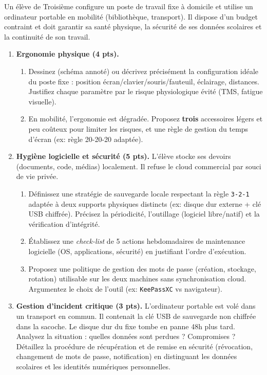 \documentclass[11pt]{article}
\begin{document}
\begin{exercice}
Un élève de Troisième configure un poste de travail fixe à domicile et utilise un ordinateur portable en mobilité (bibliothèque, transport). Il dispose d'un budget contraint et doit garantir sa santé physique, la sécurité de ses données scolaires et la continuité de son travail.

\begin{enumerate}
    \item \textbf{Ergonomie physique (4 pts).} 
    \begin{enumerate}
        \item Dessinez (schéma annoté) ou décrivez précisément la configuration idéale du poste fixe : position écran/clavier/souris/fauteuil, éclairage, distances. Justifiez chaque paramètre par le risque physiologique évité (TMS, fatigue visuelle).
        \item En mobilité, l'ergonomie est dégradée. Proposez \textbf{trois} accessoires légers et peu coûteux pour limiter les risques, et une règle de gestion du temps d'écran (ex: règle 20-20-20 adaptée).
    \end{enumerate}
    
    \item \textbf{Hygiène logicielle et sécurité (5 pts).} 
    L'élève stocke ses devoirs (documents, code, médias) localement. Il refuse le cloud commercial par souci de vie privée.
    \begin{enumerate}
        \item Définissez une stratégie de sauvegarde locale respectant la règle \texttt{3-2-1} adaptée à deux supports physiques distincts (ex: disque dur externe + clé USB chiffrée). Précisez la périodicité, l'outillage (logiciel libre/natif) et la vérification d'intégrité.
        \item Établissez une \textit{check-list} de 5 actions hebdomadaires de maintenance logicielle (OS, applications, sécurité) en justifiant l'ordre d'exécution.
        \item Proposez une politique de gestion des mots de passe (création, stockage, rotation) utilisable sur les deux machines sans synchronisation cloud. Argumentez le choix de l'outil (ex: \texttt{KeePassXC} vs navigateur).
    \end{enumerate}

    \item \textbf{Gestion d'incident critique (3 pts).} 
    L'ordinateur portable est volé dans un transport en commun. Il contenait la clé USB de sauvegarde non chiffrée dans la sacoche. Le disque dur du fixe tombe en panne 48h plus tard.
    Analysez la situation : quelles données sont perdues ? Compromises ? Détaillez la procédure de récupération et de remise en sécurité (révocation, changement de mots de passe, notification) en distinguant les données scolaires et les identités numériques personnelles.
\end{enumerate}
\end{exercice}
\end{document}
